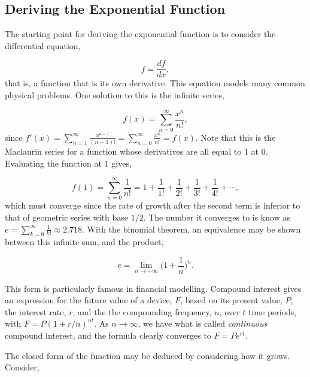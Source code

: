 \documentclass[11pt]{amsart}
\begin{document}
\subsection{Deriving the Exponential Function}

The starting point for deriving the exponential function is to consider the differential equation,

$$f = \frac{df}{dx},$$ that is, a function that is its own derivative. This equation models many common physical problems. One solution to this is the infinite series,

$$f(x) = \sum_{n=0}^{\infty} \frac{x^n}{n!},$$ since $f'(x) = \sum_{n=1}^{\infty} \frac{x^{n-1}}{(n - 1)!} = \sum_{n=0}^{\infty} \frac{x^{n}}{n!} = f(x)$. Note that this is the Maclaurin series for a function whose derivatives are all equal to 1 at 0. Evaluating the function at 1 gives,

$$f(1) = \sum_{n=0}^{\infty} \frac{1}{n!} = 1 + \frac{1}{1!} + \frac{1}{2!} + \frac{1}{3!} + \frac{1}{4!} + \cdots,$$ which must converge since the rate of growth after the second term is inferior to that of geometric series with base $1/2$. The number it converges to is know as $e = \sum_{k=0}^{\infty}  \frac{1}{k!} \approx 2.718.$ With the binomial theorem, an equivalence may be shown between this infinite sum, and the product,

$$e = \lim_{n \to +\infty} \bigg(1 + \frac{1}{n}\bigg)^n.$$

This form is particularly famous in financial modelling. Compound interest gives an expression for the future value of a device, $F$, based on its present value, $P$, the interest rate, $r$, and the the compounding frequency, $n$, over $t$ time periods, with $F = P(1 + r/n)^{nt}$. As $n\to\infty$, we have what is called \emph{continuous} compound interest, and the formula clearly converges to $F = Pe^{rt}$.

The closed form of the function may be deduced by considering how it grows. Consider,
\end{document}
